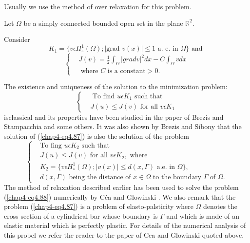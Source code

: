 Usually we use the method of over relaxation for this problem.

\begin{example}\label{chap4-exam4.8}
Let $\Omega$ be a simply connected bounded open set in the plane $\mathbb{R}^{2}$.

Consider
\begin{equation*}
 K_{1}  = \{v \epsilon H_{\circ}^{1} (\Omega); | \text{grad } v(x)| \leq 1 \text{ a. e. in } \Omega\} \text{ and }\tag{4.85}\label{chap4-eq4.85}
\end{equation*}
\begin{equation*}
\begin{cases}
& J(v) = \frac{1}{2} \int_{\Omega} |grad v|^{2} dx - C \int_{\Omega} v dx\\
& \text{ where $C$ is a constant} > 0.\tag{4.86}\label{chap4-eq4.86}
\end{cases}
\end{equation*}
\end{example}

The existence and uniqueness of the solution to the minimization problem:
\begin{equation*}
\begin{cases}
& \text{ To find } u \epsilon K_{1} \text{ such that}\\
& J(u) \leq J(v) \text{ for all } v \epsilon K_{1}\tag{4.87}\label{chap4-eq4.87}
\end{cases}
\end{equation*}
is\pageoriginale classical and its properties have been studied in the paper of Brezis and Stampacchia \cite{key4} and some others. It was also shown by Brezis and Sibony \cite{key2} that the solution of (\ref{chap4-eq4.87}) is also the solution of the problem
\begin{equation*}
\begin{cases}
& \text{To fing } u \epsilon K_{2} \text{ such that }\\
& J(u) \leq J(v) \text{ for all } v \epsilon K_{2}, \text{ where }\\
& K_{2} = \{v \epsilon H_{\circ}^{1} (\Omega) ; |v(x)| \leq d(x, \Gamma) \text{ a.e. in } \Omega\},\\
& d(x, \Gamma) \text{ being the distance of } x \in \Omega \text{ to the boundary } \Gamma \text{ of } \Omega.\tag{4.88}\label{chap4-eq4.88}
\end{cases}
\end{equation*}
The method of relaxation described earlier has been used to solve the problem (\ref{chap4-eq4.88}) numerically by C\'{e}a and Glowinski \cite{key8,key9}. We also remark that the problem (\ref{chap4-eq4.87}) is a problem of elasto-palsticity where $\Omega$ denotes the cross section of a cylindrical bar whose boundary is $\Gamma$ and which is made of an elastic material which is perfectly plastic. For details of the numerical analysis of this probel we refer the reader to the paper of Cea and Glowinski quoted above.
 
